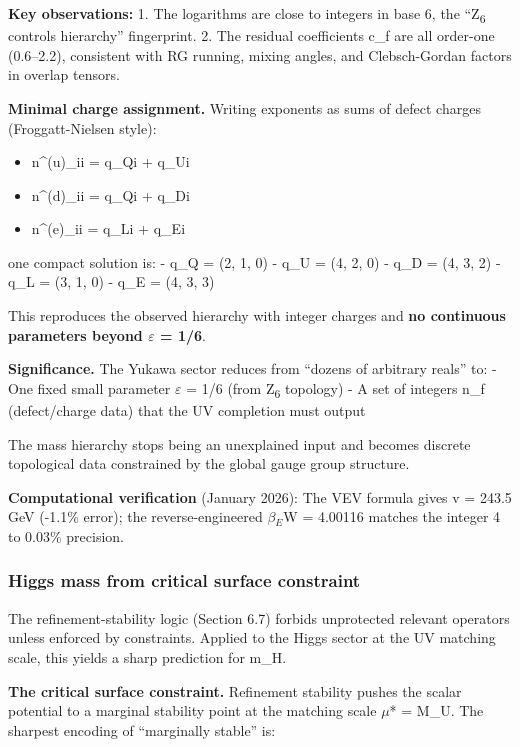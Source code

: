 \documentclass[11pt,a4paper]{article}
\theoremstyle{remark}
\providecommand{\tightlist}{%
  \setlength{\itemsep}{0pt}\setlength{\parskip}{0pt}}
\begin{document}
\textbf{Key observations:}
1. The logarithms are close to integers in base 6, the ``Z\textsubscript{6} controls hierarchy''
fingerprint.
2. The residual coefficients c\_f are all order-one (0.6--2.2), consistent with
RG running, mixing angles, and Clebsch-Gordan factors in overlap tensors.

\textbf{Minimal charge assignment.} Writing exponents as sums of defect charges (Froggatt-Nielsen style):

\begin{itemize}
\tightlist
\item
  n\^{}(u)\_ii = q\_Qi + q\_Ui
\item
  n\^{}(d)\_ii = q\_Qi + q\_Di
\item
  n\^{}(e)\_ii = q\_Li + q\_Ei
\end{itemize}

one compact solution is:
- q\_Q = (2, 1, 0)
- q\_U = (4, 2, 0)
- q\_D = (4, 3, 2)
- q\_L = (3, 1, 0)
- q\_E = (4, 3, 3)

This reproduces the observed hierarchy with integer charges and \textbf{no continuous
parameters beyond \ensuremath{\varepsilon} = 1/6}.

\textbf{Significance.} The Yukawa sector reduces from ``dozens of arbitrary reals'' to:
- One fixed small parameter \ensuremath{\varepsilon} = 1/6 (from Z\textsubscript{6} topology)
- A set of integers n\_f (defect/charge data) that the UV completion must output

The mass hierarchy stops being an unexplained input and becomes discrete
topological data constrained by the global gauge group structure.

\textbf{Computational verification} (January 2026): The VEV formula gives v = 243.5 GeV
(-1.1\% error); the reverse-engineered \(\beta{}_E\)W = 4.00116 matches the integer 4
to 0.03\% precision.

\subsubsection{Higgs mass from critical surface constraint}\label{higgs-mass-from-critical-surface-constraint}

The refinement-stability logic (Section 6.7) forbids unprotected relevant operators unless enforced by constraints. Applied to the Higgs sector at the UV matching scale, this yields a sharp prediction for m\_H.

\textbf{The critical surface constraint.} Refinement stability pushes the scalar potential to a marginal stability point at the matching scale \ensuremath{\mu}* = M\_U. The sharpest encoding of ``marginally stable'' is:
\end{document}
